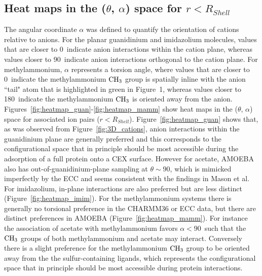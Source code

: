 \documentclass[journal=jacsat,articletitle=true,manuscript=suppinfo,layout=onecolumn]{achemso}
\begin{document}
    \newpage
    \subsection{Heat maps in the ($\theta$, $\alpha$) space for $r < R_{Shell}$}

     The angular coordinate $\alpha$ was defined to quantify the orientation of cations relative to anions. For the planar guanidinium and imidazolium molecules, values that are closer to 0\textdegree \ indicate anion interactions within the cation plane, whereas values closer to 90\textdegree \ indicate anion interactions orthogonal to the cation plane. For methylammonium, $\alpha$ represents a torsion angle, where values that are closer to 0\textdegree \ indicate the methylammonium $\ce{CH_3}$ group is spatially inline with the anion ``tail" atom that is highlighted in green in Figure~1, whereas values closer to 180\textdegree \ indicate the methylammonium $\ce{CH_3}$ is oriented away from the anion. Figures~\ref{fig:heatmap_guan}-\ref{fig:heatmap_mamm} show heat maps in the ($\theta$, $\alpha$) space for associated ion pairs ($r < R_{Shell}$). Figure~\ref{fig:heatmap_guan} shows that, as was observed from Figure~\ref{fig:3D_cations}, anion interactions within the guanidinium plane are generally preferred and this corresponds to the configurational space that in principle should be most accessible during the adsorption of a full protein onto a CEX surface. However for acetate, AMOEBA also has out-of-guanidinium-plane sampling at $\theta \sim 90$\textdegree, which is mimicked imperfectly by the ECC and seems consistent with the findings in Mason et al.\cite{Mason2019a} For imidazolium, in-plane interactions are also preferred but are less distinct (Figure~\ref{fig:heatmap_imim}). For the methylammonium systems there is generally no torsional preference in the CHARMM36 or ECC data, but there are distinct preferences in AMOEBA (Figure~\ref{fig:heatmap_mamm}). For instance the association of acetate with methylammonium favors $\alpha < 90$\textdegree \ such that the $\ce{CH_3}$ groups of both methylammonium and acetate may interact. Conversely there is a slight preference for the methylammonium $\ce{CH_3}$ group to be oriented away from the the sulfur-containing ligands, which represents the configurational space that in principle should be most accessible during protein interactions.
     
\end{document}
